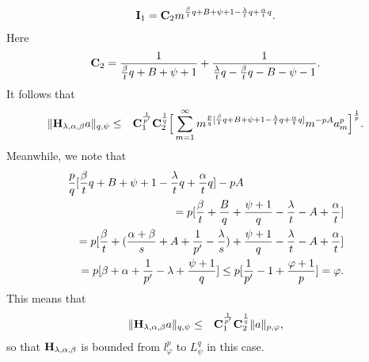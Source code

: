 \documentclass[10pt]{amsart}
\theoremstyle{definition}    %
\numberwithin{equation}{section}
\begin{document}
\begin{eqnarray}
{\bf I}_1={\bf C}_2 m^{\frac{\beta}{t}q+B+\psi+1-\frac{\lambda}{t}q+\frac{\alpha}{t}q}. \nonumber
\end{eqnarray}
Here
\begin{eqnarray}
{\bf C}_2=\frac{1}{\frac{\beta}{t}q+B+\psi+1}+\frac{1}{\frac{\lambda}{t}q-\frac{\beta}{t}q-B-\psi-1}.\nonumber
\end{eqnarray}
It follows that
 \begin{eqnarray}
\|{\bf H}_{\lambda, \alpha, \beta}a\|_{q, \psi}&\leq &{\bf C}_1^{\frac{1}{p'}}{\bf C}_2^{\frac{1}{q}}\Big[\sum_{m=1}^{\infty}m^{\frac{p}{q}[\frac{\beta}{t}q+B+\psi+1-\frac{\lambda}{t}q+\frac{\alpha}{t}q]}m^{-pA}a_m^p\Big]^{\frac{1}{p}}. \nonumber
\end{eqnarray}
Meanwhile, we note that
\begin{eqnarray}
\lefteqn{\frac{p}{q}[\frac{\beta}{t}q+B+\psi+1-\frac{\lambda}{t}q+\frac{\alpha}{t}q]-pA}\nonumber \\
&&=p[\frac{\beta}{t}+\frac{B}{q}+\frac{\psi+1}{q}-\frac{\lambda}{t}-A+\frac{\alpha}{t}]\nonumber \\
&&=p[\frac{\beta}{t}+(\frac{\alpha+\beta}{s}+A+\frac{1}{p'}-\frac{\lambda}{s})+\frac{\psi+1}{q}-\frac{\lambda}{t}-A+\frac{\alpha}{t}] \nonumber \\
&&=p[\beta+\alpha+\frac{1}{p'}-\lambda+\frac{\psi+1}{q}]\leq p[\frac{1}{p'}-1+\frac{\varphi+1}{p}]=\varphi. \nonumber
\end{eqnarray}
This means that  \begin{eqnarray}
\|{\bf H}_{\lambda, \alpha, \beta}a\|_{q, \psi}&\leq &{\bf C}_1^{\frac{1}{p'}}{\bf C}_2^{\frac{1}{q}}\|a\|_{p, \varphi}, \nonumber
\end{eqnarray}
so that ${\bf H}_{\lambda, \alpha, \beta}$ is bounded from $l_{\varphi}^{p}$ to $L_{\psi}^{q}$ in this case.
\end{document}
